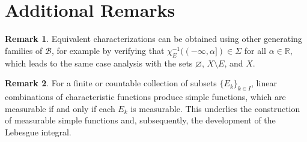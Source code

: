 \documentclass[12pt]{article}
\theoremstyle{plain}
\theoremstyle{definition}
\newtheorem{remark}{Remark}
\newcommand{\R}{\mathbb{R}}
\newcommand{\B}{\mathcal{B}}
\newcommand{\Sig}{\Sigma}
\begin{document}
\section*{Additional Remarks}
\begin{remark}
Equivalent characterizations can be obtained using other generating families of \(\B\), for example by verifying that \(\chi_E^{-1}((-\infty,\alpha]) \in \Sig\) for all \(\alpha\in\R\), which leads to the same case analysis with the sets \(\varnothing\), \(X\setminus E\), and \(X\).
\end{remark}

\begin{remark}
For a finite or countable collection of subsets \(\{E_k\}_{k\in I}\), linear combinations of characteristic functions produce simple functions, which are measurable if and only if each \(E_k\) is measurable. This underlies the construction of measurable simple functions and, subsequently, the development of the Lebesgue integral.
\end{remark}
\end{document}
